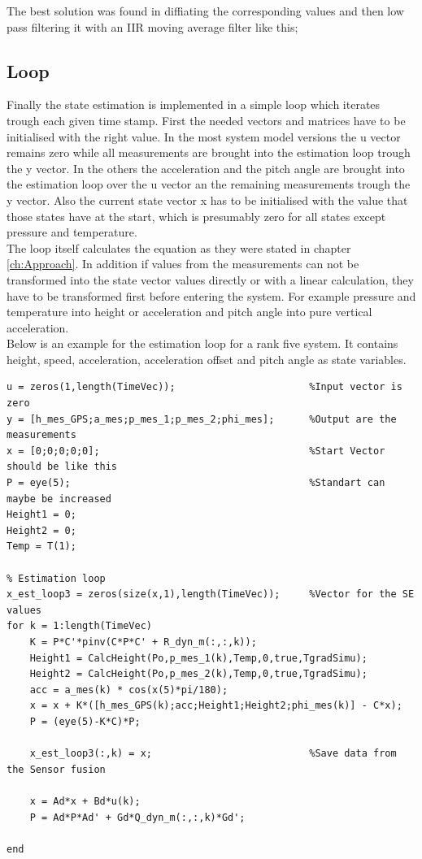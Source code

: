 The best solution was found in diffiating the corresponding values and then low pass filtering it with an IIR moving average filter like this;




\subsection{Loop}
Finally the state estimation is implemented in a simple loop which iterates trough each given time stamp.
First the needed vectors and matrices have to be initialised with the right value.
In the most system model versions the u vector remains zero while all measurements are brought into the estimation loop trough the y vector.
In the others the acceleration and the pitch angle are brought into the estimation loop over the u vector an the remaining measurements trough the y vector.
Also the current state vector x has to be initialised with the value that those states have at the start, 
which is presumably zero for all states except pressure and temperature.\\
The loop itself calculates the equation as they were stated in chapter \ref{ch:Approach}.
In addition if values from the measurements can not be transformed into the state vector values directly or with a linear calculation,
they have to be transformed first before entering the system.
For example pressure and temperature into height or acceleration and pitch angle into pure vertical acceleration.\\
Below is an example for the estimation loop for a rank five system.
It contains height, speed, acceleration, acceleration offset and pitch angle as state variables.
\begin{lstlisting}[caption={State Estimation Loop}]
% Initalzation
u = zeros(1,length(TimeVec));                       %Input vector is zero
y = [h_mes_GPS;a_mes;p_mes_1;p_mes_2;phi_mes];      %Output are the measurements
x = [0;0;0;0;0];                                    %Start Vector should be like this
P = eye(5);                                         %Standart can maybe be increased
Height1 = 0;
Height2 = 0;
Temp = T(1);

% Estimation loop
x_est_loop3 = zeros(size(x,1),length(TimeVec));     %Vector for the SE values
for k = 1:length(TimeVec)
    K = P*C'*pinv(C*P*C' + R_dyn_m(:,:,k));
    Height1 = CalcHeight(Po,p_mes_1(k),Temp,0,true,TgradSimu);
    Height2 = CalcHeight(Po,p_mes_2(k),Temp,0,true,TgradSimu);
    acc = a_mes(k) * cos(x(5)*pi/180);
    x = x + K*([h_mes_GPS(k);acc;Height1;Height2;phi_mes(k)] - C*x);
    P = (eye(5)-K*C)*P;
    
    x_est_loop3(:,k) = x;                           %Save data from the Sensor fusion
    
    x = Ad*x + Bd*u(k);
    P = Ad*P*Ad' + Gd*Q_dyn_m(:,:,k)*Gd';

end
\end{lstlisting}

